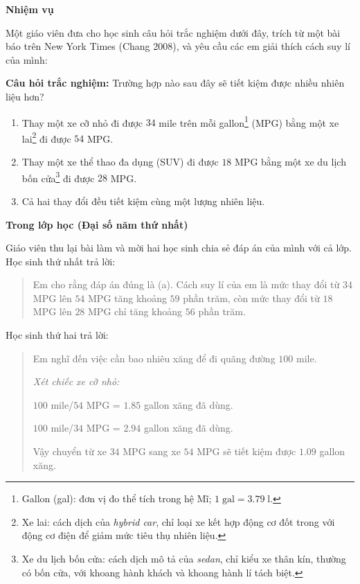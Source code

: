   {
    \textbf{Nhiệm vụ}

    Một giáo viên đưa cho học sinh câu hỏi trắc nghiệm dưới đây, trích từ một bài báo trên New York Times (Chang 2008), và yêu cầu các em giải thích cách suy lí của mình:

    \textbf{Câu hỏi trắc nghiệm:} Trường hợp nào sau đây sẽ tiết kiệm được nhiều nhiên liệu hơn?

    \begin{enumerate}
      \item [(a)] Thay một xe cỡ nhỏ đi được $34$ mile trên mỗi gallon\footnote{Gallon (gal): đơn vị đo thể tích trong hệ Mĩ; $1\;\text{gal}=3.79\;\text{l}$.} (MPG) bằng một xe lai\footnote{Xe lai: cách dịch của \emph{hybrid car}, chỉ loại xe kết hợp động cơ đốt trong với động cơ điện để giảm mức tiêu thụ nhiên liệu.} đi được $54$ MPG.

      \item [(b)] Thay một xe thể thao đa dụng (SUV) đi được $18$ MPG bằng một xe du lịch bốn cửa\footnote{Xe du lịch bốn cửa: cách dịch mô tả của \emph{sedan}, chỉ kiểu xe thân kín, thường có bốn cửa, với khoang hành khách và khoang hành lí tách biệt.} đi được $28$ MPG.

      \item [(c)] Cả hai thay đổi đều tiết kiệm cùng một lượng nhiên liệu.
    \end{enumerate}

    \textbf{Trong lớp học (Đại số năm thứ nhất)}

    Giáo viên thu lại bài làm và mời hai học sinh chia sẻ đáp án của mình với cả lớp. Học sinh thứ nhất trả lời:

    \begin{quote}
      Em cho rằng đáp án đúng là (a). Cách suy lí của em là mức thay đổi từ $34$ MPG lên $54$ MPG tăng khoảng $59$ phần trăm, còn mức thay đổi từ $18$ MPG lên $28$ MPG chỉ tăng khoảng $56$ phần trăm.
    \end{quote}

    Học sinh thứ hai trả lời:

    \begin{quote}
      Em nghĩ đến việc cần bao nhiêu xăng để đi quãng đường $100$ mile.

      \emph{Xét chiếc xe cỡ nhỏ:}

      $100$ mile/$54$ MPG = $1.85$ gallon xăng đã dùng.

      $100$ mile/$34$ MPG = $2.94$ gallon xăng đã dùng.

      Vậy chuyển từ xe $34$ MPG sang xe $54$ MPG sẽ tiết kiệm được $1.09$ gallon xăng.


\end{quote}}

